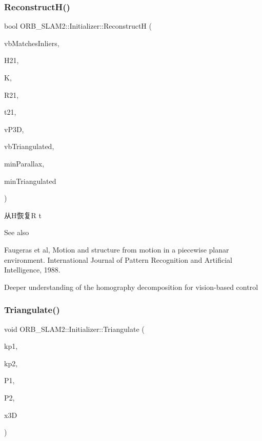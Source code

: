 \subsubsection{\texorpdfstring{Reconstruct\+H()}{ReconstructH()}}
{\footnotesize\ttfamily bool O\+R\+B\+\_\+\+S\+L\+A\+M2\+::\+Initializer\+::\+ReconstructH (\begin{DoxyParamCaption}\item[{vector$<$ bool $>$ \&}]{vb\+Matches\+Inliers,  }\item[{cv\+::\+Mat \&}]{H21,  }\item[{cv\+::\+Mat \&}]{K,  }\item[{cv\+::\+Mat \&}]{R21,  }\item[{cv\+::\+Mat \&}]{t21,  }\item[{vector$<$ cv\+::\+Point3f $>$ \&}]{v\+P3D,  }\item[{vector$<$ bool $>$ \&}]{vb\+Triangulated,  }\item[{float}]{min\+Parallax,  }\item[{int}]{min\+Triangulated }\end{DoxyParamCaption})\hspace{0.3cm}{\ttfamily [private]}}



从\+H恢复R t 

\begin{DoxySeeAlso}{See also}

\begin{DoxyItemize}
\item Faugeras et al, Motion and structure from motion in a piecewise planar environment. International Journal of Pattern Recognition and Artificial Intelligence, 1988.
\item Deeper understanding of the homography decomposition for vision-\/based control 
\end{DoxyItemize}
\end{DoxySeeAlso}
\mbox{\label{class_o_r_b___s_l_a_m2_1_1_initializer_a3bdf78e0f16be44b5ab312aac5cac5af}} 
\subsubsection{\texorpdfstring{Triangulate()}{Triangulate()}}
{\footnotesize\ttfamily void O\+R\+B\+\_\+\+S\+L\+A\+M2\+::\+Initializer\+::\+Triangulate (\begin{DoxyParamCaption}\item[{const cv\+::\+Key\+Point \&}]{kp1,  }\item[{const cv\+::\+Key\+Point \&}]{kp2,  }\item[{const cv\+::\+Mat \&}]{P1,  }\item[{const cv\+::\+Mat \&}]{P2,  }\item[{cv\+::\+Mat \&}]{x3D }\end{DoxyParamCaption})\hspace{0.3cm}{\ttfamily [private]}}




